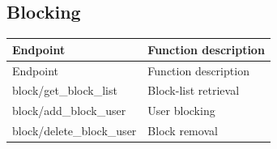 \subsection{Blocking}

\begin{longtable}{>{\ttfamily}p{}p{}}
\toprule
Endpoint & Function description \\
\midrule
\endfirsthead%

\toprule
Endpoint & Function description \\
\midrule
\endhead%

block/get\_block\_list
    & Block-list retrieval \\

block/add\_block\_user
    & User blocking \\

block/delete\_block\_user
    & Block removal \\

\bottomrule
\end{longtable}